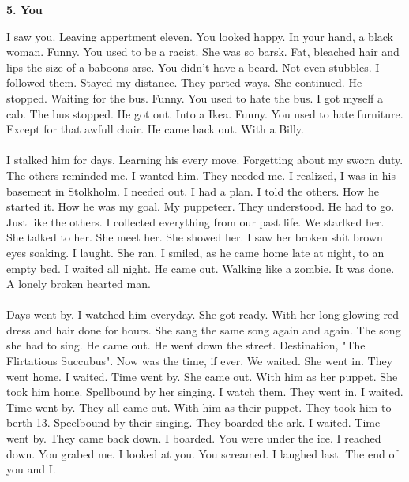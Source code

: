 \documentclass[]{article}
\begin{document}
\newpage

\begin{center}
	\large\textbf{5. You}
\end{center}

I saw you. Leaving appertment eleven. You looked happy. In your hand, a black woman. Funny. You used to be a racist. She was so barsk. Fat, bleached hair and lips the size of a baboons arse. You didn't have a beard. Not even stubbles. I followed them. Stayed my distance. They parted ways. She continued. He stopped. Waiting for the bus. Funny. You used to hate the bus. I got myself a cab. The bus stopped. He got out. Into a Ikea. Funny. You used to hate furniture. Except for that awfull chair. He came back out. With a Billy.
\\ \\
I stalked him for days. Learning his every move. Forgetting about my sworn duty. The others reminded me. I wanted him. They needed me. I realized, I was in his basement in Stolkholm. I needed out. I had a plan. I told the others. How he started it. How he was my goal. My puppeteer. They understood. He had to go. Just like the others. I collected everything from our past life. We starlked her. She talked to her. She meet her. She showed her. I saw her broken shit brown eyes soaking. I laught. She ran. I smiled, as he came home late at night, to an empty bed. I waited all night. He came out. Walking like a zombie. It was done. A lonely broken hearted man.
\\ \\
Days went by. I watched him everyday. She got ready. With her long glowing red dress and hair done for hours. She sang the same song again and again. The song she had to sing. He came out. He went down the street. Destination, "The Flirtatious Succubus". Now was the time, if ever. We waited. She went in. They went home. I waited. Time went by. She came out. With him as her puppet. She took him home. Spellbound by her singing. I watch them. They went in. I waited. Time went by. They all came out. With him as their puppet. They took him to berth 13. Speelbound by their singing. They boarded the ark. I waited. Time went by. They came back down. I boarded. You were under the ice. I reached down. You grabed me. I looked at you. You screamed. I laughed last. The end of you and I.
\end{document}
